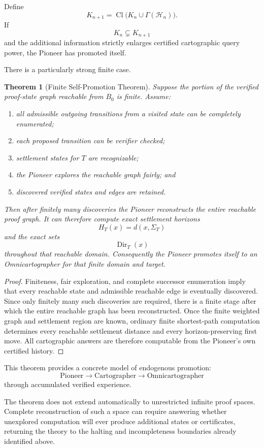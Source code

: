 \documentclass[11pt]{article}
\newtheorem{theorem}{Theorem}[section]
\newcommand{\Cl}{\operatorname{Cl}}
\newcommand{\Dir}{\operatorname{Dir}}
\begin{document}
Define
\[
K_{n+1}=\Cl\bigl(K_n\cup\Gamma(\mathcal H_n)\bigr).
\]
If
\[
K_n\subsetneq K_{n+1}
\]
and the additional information strictly enlarges certified cartographic query power, the Pioneer has promoted itself.

There is a particularly strong finite case.

\begin{theorem}[Finite Self-Promotion Theorem]
Suppose the portion of the verified proof-state graph reachable from $B_0$ is finite. Assume:
\begin{enumerate}[label=(\arabic*)]
\item all admissible outgoing transitions from a visited state can be completely enumerated;
\item each proposed transition can be verifier checked;
\item settlement states for $T$ are recognizable;
\item the Pioneer explores the reachable graph fairly; and
\item discovered verified states and edges are retained.
\end{enumerate}
Then after finitely many discoveries the Pioneer reconstructs the entire reachable proof graph. It can therefore compute exact settlement horizons
\[
H_T(x)=d(x,\Sigma_T)
\]
and the exact sets
\[
\Dir_T(x)
\]
throughout that reachable domain. Consequently the Pioneer promotes itself to an Omnicartographer for that finite domain and target.
\end{theorem}

\begin{proof}
Finiteness, fair exploration, and complete successor enumeration imply that every reachable state and admissible reachable edge is eventually discovered. Since only finitely many such discoveries are required, there is a finite stage after which the entire reachable graph has been reconstructed. Once the finite weighted graph and settlement region are known, ordinary finite shortest-path computation determines every reachable settlement distance and every horizon-preserving first move. All cartographic answers are therefore computable from the Pioneer's own certified history.
\end{proof}

This theorem provides a concrete model of endogenous promotion:
\[
\text{Pioneer}\longrightarrow\text{Cartographer}\longrightarrow\text{Omnicartographer}
\]
through accumulated verified experience.

The theorem does not extend automatically to unrestricted infinite proof spaces. Complete reconstruction of such a space can require answering whether unexplored computation will ever produce additional states or certificates, returning the theory to the halting and incompleteness boundaries already identified above.
\end{document}
